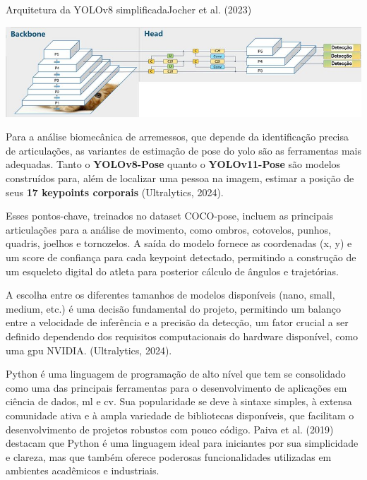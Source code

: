 \begin{figura}{Arquitetura da YOLOv8 simplificada}{Jocher et al. (2023)}
    \begin{flushleft}
        \label{fig:arqyolo}
        \includegraphics[width=1.0\linewidth]{resources/floats/ilustracoes/arquiteturayolo.png}
    \end{flushleft}
\end{figura}
\FloatBarrier


Para a análise biomecânica de arremessos, que depende da identificação precisa de articulações, as variantes de estimação de pose do \ac{yolo} são as ferramentas mais adequadas. 
Tanto o \textbf{YOLOv8-Pose} quanto o \textbf{YOLOv11-Pose} são modelos construídos para, além de localizar uma pessoa na imagem, estimar a posição de seus \textbf{17 keypoints corporais} (Ultralytics, 2024).

Esses pontos-chave, treinados no dataset COCO-pose, incluem as principais articulações para a análise de movimento, como ombros, cotovelos, punhos, quadris, joelhos e tornozelos. 
A saída do modelo fornece as coordenadas (x, y) e um score de confiança para cada keypoint detectado, permitindo a construção de um esqueleto digital do atleta para posterior cálculo de ângulos e trajetórias. 

A escolha entre os diferentes tamanhos de modelos disponíveis (nano, small, medium, etc.) é uma decisão fundamental do projeto, permitindo um balanço entre a velocidade de inferência e a precisão da detecção, 
um fator crucial a ser definido dependendo dos requisitos computacionais do hardware disponível, como uma \ac{gpu} NVIDIA. (Ultralytics, 2024).


Python é uma linguagem de programação de alto nível que tem se consolidado como uma das principais ferramentas para o desenvolvimento de aplicações em ciência de dados, \ac{ml} e \ac{cv}. 
Sua popularidade se deve à sintaxe simples, à extensa comunidade ativa e à ampla variedade de bibliotecas disponíveis, que facilitam o desenvolvimento de projetos robustos com pouco código. 
Paiva et al. (2019) destacam que Python é uma linguagem ideal para iniciantes por sua simplicidade e clareza, mas que também oferece poderosas funcionalidades utilizadas em ambientes acadêmicos e industriais.


